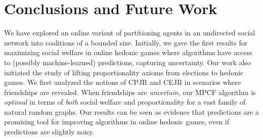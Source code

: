 \documentclass[letterpaper]{article} %
\newtheorem{theorem}{Theorem}
\begin{document}

\section{Conclusions and Future Work}
\label{sec:Conclusions and Future Work}
We have explored an online variant of partitioning agents in an undirected social network into coalitions of a bounded size. Initially, we gave the first results for maximizing social welfare in online hedonic games where algorithms have access to (possibly machine-learned) predictions, capturing uncertainty. Our work also initiated the study of lifting proportionality axioms from elections to hedonic games. We first analyzed the notions of CPJR and CEJR in scenarios where friendships are revealed. When friendships are \textit{uncertain}, our MPCF algorithm is \textit{optimal} in terms of \textit{both} social welfare and proportionality for a vast family of natural random graphs. Our results can be seen as evidence that %
predictions are a promising tool for improving algorithms in online hedonic games, even if predictions are slightly noisy. %
%
\end{document}
